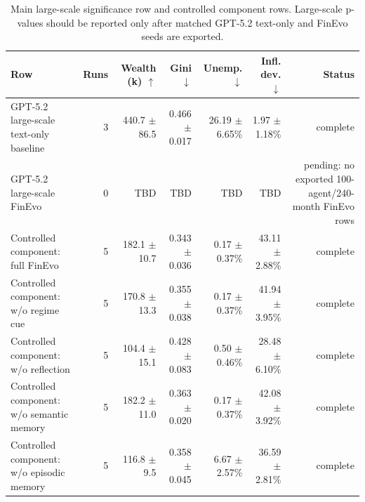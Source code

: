 \ifdefined\FinEvoAllowHistoricalPrePZeroEvidence\else
{}
\fi
\begin{table}[t]
\centering
\scriptsize
\setlength{\tabcolsep}{3pt}
\begin{tabular}{lrrrrrr}
\toprule
Row & Runs & Wealth (k) $\uparrow$ & Gini $\downarrow$ & Unemp. $\downarrow$ & Infl. dev. $\downarrow$ & Status \\
\midrule
GPT-5.2 large-scale text-only baseline & 3 & 440.7 $\pm$ 86.5 & 0.466 $\pm$ 0.017 & 26.19 $\pm$ 6.65\% & 1.97 $\pm$ 1.18\% & complete \\
GPT-5.2 large-scale FinEvo & 0 & TBD & TBD & TBD & TBD & pending: no exported 100-agent/240-month FinEvo rows \\
Controlled component: full FinEvo & 5 & 182.1 $\pm$ 10.7 & 0.343 $\pm$ 0.036 & 0.17 $\pm$ 0.37\% & 43.11 $\pm$ 2.88\% & complete \\
Controlled component: w/o regime cue & 5 & 170.8 $\pm$ 13.3 & 0.355 $\pm$ 0.038 & 0.17 $\pm$ 0.37\% & 41.94 $\pm$ 3.95\% & complete \\
Controlled component: w/o reflection & 5 & 104.4 $\pm$ 15.1 & 0.428 $\pm$ 0.083 & 0.50 $\pm$ 0.46\% & 28.48 $\pm$ 6.10\% & complete \\
Controlled component: w/o semantic memory & 5 & 182.2 $\pm$ 11.0 & 0.363 $\pm$ 0.020 & 0.17 $\pm$ 0.37\% & 42.08 $\pm$ 3.92\% & complete \\
Controlled component: w/o episodic memory & 5 & 116.8 $\pm$ 9.5 & 0.358 $\pm$ 0.045 & 6.67 $\pm$ 2.57\% & 36.59 $\pm$ 2.81\% & complete \\
\bottomrule
\end{tabular}
\caption{Main large-scale significance row and controlled component rows. Large-scale p-values should be reported only after matched GPT-5.2 text-only and FinEvo seeds are exported.}
\label{tab:main_significance_and_ablation}
\end{table}
